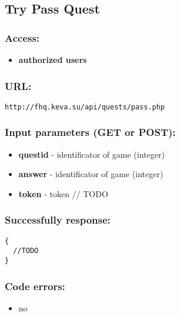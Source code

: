 \subsection{Try Pass Quest}
\par

\subsubsection{Access:}
\begin{itemize}
  \item \textbf{authorized users}
\end{itemize}

\subsubsection{URL:}
\begin{Verbatim}[frame=single]
http://fhq.keva.su/api/quests/pass.php
\end{Verbatim}

\subsubsection{Input parameters (GET or POST):}
\begin{itemize}
  \item \textbf{questid} - identificator of game (integer)
  \item \textbf{answer} - identificator of game (integer)
  \item \textbf{token} - token // TODO
\end{itemize}

\subsubsection{Successfully response:}
\begin{Verbatim}[frame=single]
{
  //TODO
}
\end{Verbatim}

\subsubsection{Code errors:}
\begin{itemize}
	\item no
\end{itemize}

